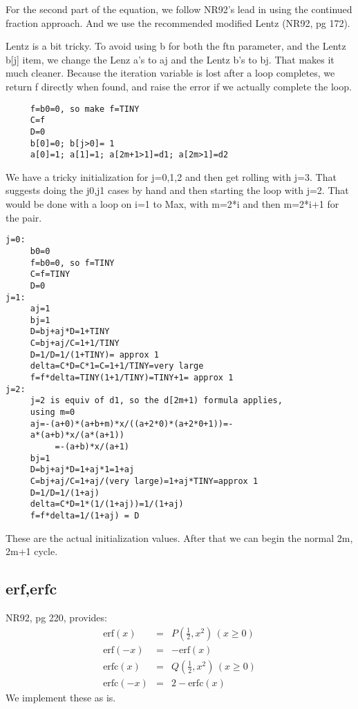 For the second part of the equation, we follow NR92's lead
in using the continued fraction approach.   And we use the recommended
modified Lentz (NR92, pg 172).  

Lentz is a bit tricky.
To avoid using b for both the ftn
parameter, and the Lentz b[j] item, we change the Lenz
a's to aj and the Lentz b's to bj.  That makes it much
cleaner.  Because the iteration variable is lost after a
loop completes, we return f directly when found,
and raise the error if we actually complete the loop.
\begin{verbatim}
     f=b0=0, so make f=TINY
     C=f
     D=0
     b[0]=0; b[j>0]= 1
     a[0]=1; a[1]=1; a[2m+1>1]=d1; a[2m>1]=d2
\end{verbatim}

We have a tricky initialization for j=0,1,2 and
then get rolling with j=3.  That suggests doing the j0,j1
cases by hand and then starting the loop with j=2.  That
would be done with a loop on i=1 to Max, with m=2*i and then
m=2*i+1 for the pair.
\begin{verbatim}
j=0:
     b0=0
     f=b0=0, so f=TINY
     C=f=TINY
     D=0
j=1:
     aj=1
     bj=1
     D=bj+aj*D=1+TINY
     C=bj+aj/C=1+1/TINY
     D=1/D=1/(1+TINY)= approx 1
     delta=C*D=C*1=C=1+1/TINY=very large
     f=f*delta=TINY(1+1/TINY)=TINY+1= approx 1
j=2:
     j=2 is equiv of d1, so the d[2m+1) formula applies,
     using m=0
     aj=-(a+0)*(a+b+m)*x/((a+2*0)*(a+2*0+1))=-
     a*(a+b)*x/(a*(a+1))
          =-(a+b)*x/(a+1)
     bj=1
     D=bj+aj*D=1+aj*1=1+aj
     C=bj+aj/C=1+aj/(very large)=1+aj*TINY=approx 1
     D=1/D=1/(1+aj)
     delta=C*D=1*(1/(1+aj))=1/(1+aj)
     f=f*delta=1/(1+aj) = D
\end{verbatim}
These are the actual initialization values.  After that we
can begin the normal 2m, 2m+1 cycle.


\subsection*{erf,erfc}
NR92, pg 220, provides:
\begin{eqnarray}
  \mbox{erf}(x)  & = & P\left( \frac{1}{2},x^2 \right) \, (x \ge 0)\\
  \mbox{erf}(-x) & = & -\mbox{erf}(x)\\
  \mbox{erfc}(x) & = & Q\left( \frac{1}{2},x^2 \right) \, (x \ge 0)\\
  \mbox{erfc}(-x) & = & 2-\mbox{erfc}(x) 
\end{eqnarray}
We implement these as is. 

